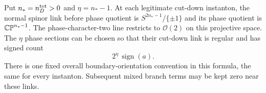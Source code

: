 \begin{proposition}
\label{prop:analysis:instanton-link}
Put $n_*=n_D^{\rm tot}>0$ and $\eta=n_*-1$.  At each legitimate
cut-down instanton, the normal spinor link before phase quotient is
$S^{2n_*-1}/\{\pm1\}$ and its phase quotient is $\mathbb{CP}^{n_*-1}$.
The phase-character-two line restricts to $\mathcal O(2)$ on this
projective space.  The $\eta$ phase sections can be chosen so that
their cut-down link is regular and has signed count
\begin{equation}\label{eq:analysis:instanton-degree}
 2^\eta\,\operatorname{sign}(a).
\end{equation}
There is one fixed overall boundary-orientation convention in this
formula, the same for every instanton.  Subsequent mixed branch terms
may be kept zero near these links.
\end{proposition}
